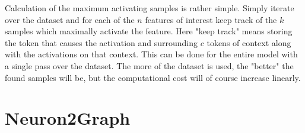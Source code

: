 \documentclass[../main.tex]{subfiles}
\begin{document}
Calculation of the maximum activating samples is rather simple.
Simply iterate over the dataset 
and for each of the $n$ features of interest 
keep track of the $k$ samples which maximally activate the feature.
Here "keep track" means storing the token that causes the activation and 
surrounding $c$ tokens of context along with the activations on that context.
This can be done for the entire model with a single pass over the dataset.
The more of the dataset is used, the "better" the found samples will be, 
but the computational cost will of course increase linearly.

\section{Neuron2Graph}

\end{document}
